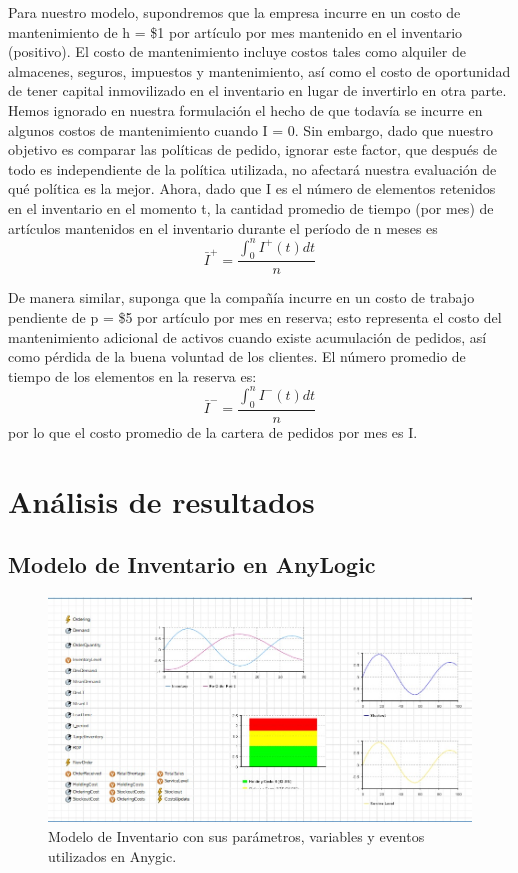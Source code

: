 Para nuestro modelo, supondremos que la empresa incurre en un costo de mantenimiento de
h = \$1 por artículo por mes mantenido en el inventario (positivo).
El costo de mantenimiento incluye costos tales como alquiler de almacenes, seguros, impuestos
y mantenimiento, así como el costo de oportunidad de tener capital inmovilizado en el inventario
en lugar de invertirlo en otra parte.
Hemos ignorado en nuestra formulación el hecho de que todavía se incurre en algunos costos de
mantenimiento cuando I = 0.
Sin embargo, dado que nuestro objetivo es comparar las políticas de pedido, ignorar este factor,
que después de todo es independiente de la política utilizada, no afectará nuestra evaluación
de qué política es la mejor.
Ahora, dado que I es el número de elementos retenidos en el inventario en el momento t,
la cantidad promedio de tiempo (por mes) de artículos mantenidos en el inventario durante el
período de n meses es
\begin{equation}
  \label{eq:equation11}
  \bar{I}^{+}=\frac{\int_{0}^{n}I^{+}(t)dt}{n}
\end{equation}

De manera similar, suponga que la compañía incurre en un costo de trabajo pendiente de p = \$5 por
artículo por mes en reserva;
esto representa el costo del mantenimiento adicional de activos cuando existe acumulación de pedidos,
así como pérdida de la buena voluntad de los clientes.
El número promedio de tiempo de los elementos en la reserva es:
\begin{equation}
    \label{eq:equation12}
    \bar{I}^{-}=\frac{\int_{0}^{n}I^{-}(t)dt}{n}
\end{equation}
por lo que el costo promedio de la cartera de pedidos por mes es \pi I.

\section{Análisis de resultados}

    

\subsection{Modelo de Inventario en AnyLogic}
\label{subsec:modelo-de-inventario-en-anylogic}
    \begin{figure}[H]
        \includegraphics[width=\linewidth]{images/anylogic-inventario}
        \caption{Modelo de Inventario con sus parámetros, variables y eventos utilizados en Anygic.}
    \end{figure}

